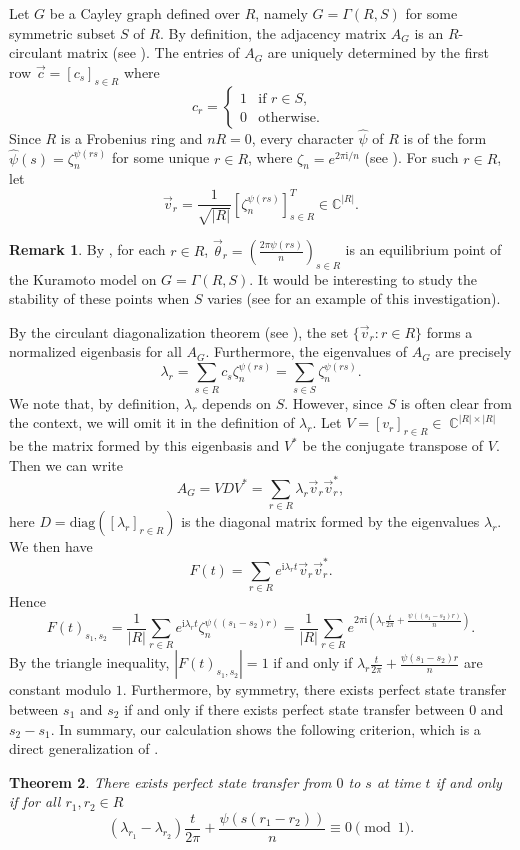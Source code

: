 \documentclass[12pt, a4paper]{amsart}
\newtheorem{thm}{Theorem}[section]
\theoremstyle{definition}
\newtheorem{rem}[thm]{Remark}
\DeclareMathOperator{\C}{\mathbb{C}}
\numberwithin{equation}{section}
\renewcommand{\i}{\mathrm{i}}
\begin{document}
Let $G$ be a Cayley graph defined over $R$, namely $G= \Gamma(R,S)$ for some symmetric subset $S$ of $R.$ By definition, the adjacency matrix $A_G$ is an $R$-circulant matrix (see \cite{kanemitsu2013matrices, chebolu2022joins}). The entries of $A_G$ are uniquely determined by the first row $\vec{c}=[c_s]_{s \in R}$ where 
\[
c_r=
\begin{cases}
1 & \text{if } r \in S, \\
0 & \text{otherwise. } 
\end{cases}
\]
Since $R$ is a Frobenius ring and $nR=0$, every character $\widehat{\psi}$ of $R$ is of the form $\widehat{\psi}(s)= \zeta_n^{\psi(rs)}$ for some unique $r \in R$, where $\zeta_n=e^{2\pi\i/n}$ (see \cite{lamprecht1953allgemeine, nguyen2024integral}).  For such $r \in R$, let 
\[ \vec{v}_r = \frac{1}{\sqrt{|R|}}[\zeta_n^{\psi(rs)}]_{s \in R}^{T} \in \mathbb{C}^{|R|} .\] 
\begin{rem}
By \cite[Proposition 10]{nguyen2023equilibria}, for each $r \in R$,  $\vec{\theta}_r = \left(\frac{2 \pi \psi(rs)}{n} \right)_{s \in R}$ is an equilibrium point of the Kuramoto model on $G = \Gamma(R,S).$ It would be interesting to study the stability of these points when $S$ varies (see \cite{townsend2020dense} for an example of this investigation). 
\end{rem}

By the circulant diagonalization theorem (see \cite{kanemitsu2013matrices}), the set $\{\vec{v}_r : r \in R\}$ forms a normalized eigenbasis for all $A_G$. Furthermore,  the eigenvalues of $A_G$ are precisely
\[ \lambda_r = \sum_{s \in R} c_s \zeta_{n}^{\psi(rs)} = \sum_{s \in S} \zeta_n^{\psi(rs)}.\]
We note that, by definition, $\lambda_r$ depends on $S$. However, since $S$ is often clear from the context, we will omit it in the definition of $\lambda_r.$ 
Let $V = [v_r]_{r \in R} \in \C^{|R| \times |R|}$ be the matrix formed by this eigenbasis and $V^{*}$ be the conjugate transpose of $V$. Then we can write
\[ A_G = V D V^*=\sum_{r \in R} \lambda_r \vec{v}_r\vec{v}_r^{*},\]
here $D =\text{diag}([\lambda_r]_{r \in R})$ is the diagonal matrix formed by the eigenvalues $\lambda_r.$ We then have
\[ F(t)= \sum_{r \in R} e^{\mathrm{i} \lambda_r t} \vec{v}_r \vec{v}_r^{*}. \]
Hence
\[ F(t)_{s_1, s_2} = \frac{1}{|R|} \sum_{r \in R} e^{\mathrm{i} \lambda_r t} \zeta_n^{\psi((s_1-s_2)r)} = \frac{1}{|R|} \sum_{r \in R} e^{2 \pi \mathrm{i} \left(\lambda_r \frac{t}{2 \pi}+\frac{ \psi((s_1-s_2)r)}{n}\right)}. \]
By the triangle inequality, $|F(t)_{s_1, s_2}|=1$ if and only if $\lambda_r \frac{t}{2 \pi} + \frac{\psi(s_1-s_2)r}{n}$ are constant modulo $1.$ Furthermore, by symmetry, there exists perfect state transfer between $s_1$ and $s_2$ if and only if there exists perfect state transfer between $0$ and $s_2-s_1.$ In summary, our calculation shows the following criterion, which is a direct generalization of \cite[Theorem 4]{bavsic2009perfect}.
\begin{thm} \label{prop:condition}
    There exists perfect state transfer from $0$ to $s$ at time $t$ if and only if for all $r_1, r_2 \in R$
    \[ (\lambda_{r_1}-\lambda_{r_2}) \frac{t}{2 \pi} + \frac{\psi(s(r_1-r_2))}{n} \equiv 0 \pmod{1}.\]
\end{thm}
\end{document}
